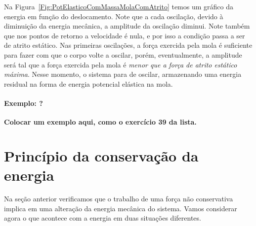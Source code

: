 Na Figura~\ref{Fig:PotElasticoComMassaMolaComAtrito} temos um gráfico da energia em função do deslocamento. Note que a cada oscilação, devido à diminuição da energia mecânica, a amplitude da oscilação diminui. Note também que nos pontos de retorno a velocidade é nula, e por isso a condição passa a ser de atrito estático. Nas primeiras oscilações, a força exercida pela mola é suficiente para fazer com que o corpo volte a oscilar, porém, eventualmente, a amplitude será tal que a força exercida pela mola é \emph{menor que a força de atrito estático máxima}. Nesse momento, o sistema para de oscilar, armazenando uma energia residual na forma de energia potencial elástica na mola.

\paragraph{Exemplo: ?}

\textbf{Colocar um exemplo aqui, como o exercício 39 da lista.}

\section{Princípio da conservação da energia}
\label{Sec:PrincipioDaConsDaEnergia}



Na seção anterior verificamos que o trabalho de uma força não conservativa implica em uma alteração da energia mecânica do sistema. Vamos considerar agora o que acontece com a energia em duas situações diferentes. 

